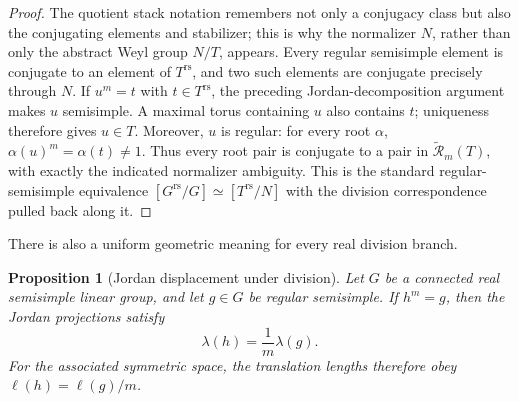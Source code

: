\documentclass[11pt,reqno]{amsart}
\newtheorem{proposition}[theorem]{Proposition}
\theoremstyle{definition}
\theoremstyle{remark}
\newcommand{\cR}{\mathcal R}
\newcommand{\rs}{\mathrm{rs}}
\begin{document}
\begin{proof}
The quotient stack notation remembers not only a conjugacy class but also
the conjugating elements and stabilizer; this is why the normalizer \(N\),
rather than only the abstract Weyl group \(N/T\), appears.
Every regular semisimple element is conjugate to an element of \(T^{\rs}\),
and two such elements are conjugate precisely through \(N\).  If \(u^m=t\)
with \(t\in T^{\rs}\), the preceding Jordan-decomposition argument makes
\(u\) semisimple.  A maximal torus containing \(u\) also contains \(t\);
uniqueness therefore gives \(u\in T\).  Moreover, \(u\) is regular:
for every root \(\alpha\), \(\alpha(u)^m=\alpha(t)\ne1\).
Thus every root pair is conjugate to a pair in
\(\widetilde{\cR}_m(T)\), with exactly the indicated normalizer ambiguity.
This is the standard regular-semisimple equivalence
\([G^{\rs}/G]\simeq[T^{\rs}/N]\) with the division correspondence pulled
back along it.
\end{proof}

There is also a uniform geometric meaning for every real division branch.

\begin{proposition}[Jordan displacement under division]
Let \(G\) be a connected real semisimple linear group, and let \(g\in G\) be
regular semisimple.  If \(h^m=g\), then the Jordan projections satisfy
\[
 \lambda(h)=\frac1m\lambda(g).
\tag{3.3}
\]
For the associated symmetric space, the translation lengths therefore obey
\(\ell(h)=\ell(g)/m\).
\end{proposition}
\end{document}
